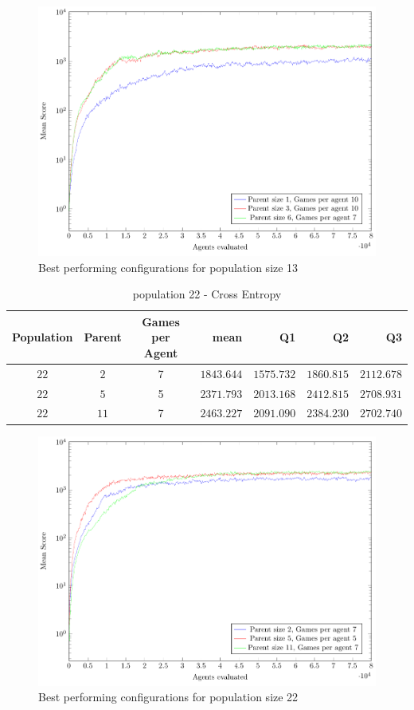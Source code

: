 \begin{figure}[H]
\centering
\includegraphics[scale=1]{data/ce_population_offspring/bestofeach_population/13x/PlotFile.pdf}
\caption{Best performing configurations for population size 13}
\end{figure}

\clearpage

\begin{table}[H]
\centering
\small
\begin{tabular}{c c c r r r r}
Population & Parent & Games per Agent & mean & Q1 & Q2 & Q3\\
\hline
$22$ & $2$ & 7 & $1843.644$ & $1575.732$ & $1860.815$ & $2112.678$\\
$22$ & $5$ & 5 & $2371.793$ & $2013.168$ & $2412.815$ & $2708.931$\\
$22$ & $11$ & 7 & $2463.227$ & $2091.090$ & $2384.230$ & $2702.740$\\
\end{tabular}
\caption{population 22 - Cross Entropy}
\end{table}

\begin{figure}[H]
\centering
\includegraphics[scale=1]{data/ce_population_offspring/bestofeach_population/22x/PlotFile.pdf}
\caption{Best performing configurations for population size 22}
\end{figure}

